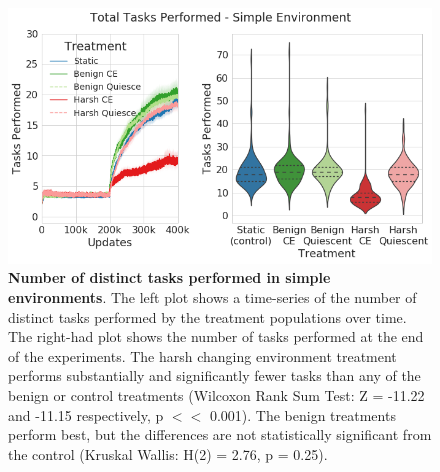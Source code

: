 \documentclass[PhD]{msu-thesis}
\begin{document}
	\begin{figure}[!h]
	\includegraphics[width=0.95\columnwidth]{figures/LTE/lte-simple-task_performance.png}
	\caption{\textbf{Number of distinct tasks performed in simple environments}. The left plot shows a time-series of the number of distinct tasks performed by the treatment populations over time. The right-had plot shows the number of tasks performed at the end of the experiments. The harsh changing environment treatment performs substantially and significantly fewer tasks than any of the benign or control treatments (Wilcoxon Rank Sum Test: Z = -11.22 and -11.15 respectively, p $<<$ 0.001). The benign treatments perform best, but the differences are not statistically significant from the control (Kruskal Wallis: H(2) = 2.76, p = 0.25). %
	}
	\label{fig:lte-simple-task_performance}
	\end{figure}  
\end{document}
